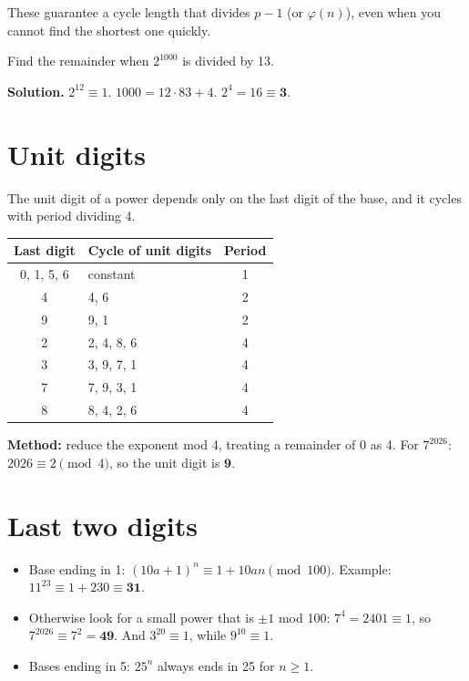 \documentclass[11pt,a4paper,openany]{report}
\begin{document}
These guarantee a cycle length that divides $p-1$ (or $\varphi(n)$), even when you cannot find the shortest one quickly.

\begin{example}[Fermat]
Find the remainder when $2^{1000}$ is divided by 13.

\textbf{Solution.} $2^{12}\equiv1$. $1000=12\cdot83+4$. $2^4=16\equiv\mathbf{3}$.
\end{example}

\section{Unit digits}
The unit digit of a power depends only on the last digit of the base, and it cycles with period dividing 4.
\begin{center}\small
\begin{tabular}{c|l|c}
\toprule
Last digit & Cycle of unit digits & Period\\\midrule
0, 1, 5, 6 & constant & 1\\
4 & 4, 6 & 2\\
9 & 9, 1 & 2\\
2 & 2, 4, 8, 6 & 4\\
3 & 3, 9, 7, 1 & 4\\
7 & 7, 9, 3, 1 & 4\\
8 & 8, 4, 2, 6 & 4\\
\bottomrule
\end{tabular}
\end{center}
\textbf{Method:} reduce the exponent mod 4, treating a remainder of 0 as 4. For $7^{2026}$: $2026\equiv2\pmod4$, so the unit digit is $\mathbf{9}$.

\section{Last two digits}
\begin{itemize}
\item Base ending in 1: $(10a+1)^n\equiv1+10an\pmod{100}$. Example: $11^{23}\equiv1+230\equiv\mathbf{31}$.
\item Otherwise look for a small power that is $\pm1$ mod 100: $7^4=2401\equiv1$, so $7^{2026}\equiv7^2=\mathbf{49}$. And $3^{20}\equiv1$, while $9^{10}\equiv1$.
\item Bases ending in 5: $25^n$ always ends in 25 for $n\ge1$.
\end{itemize}
\end{document}
